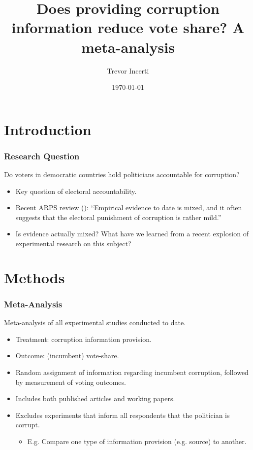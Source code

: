 \documentclass[usenames,dvipsnames]{beamer}
\title{Does providing corruption information reduce vote share? A meta-analysis}
\date{\today}
\author{Trevor Incerti}
\institute{Yale University}
\begin{document}
\maketitle


\section{Introduction}

\begin{frame}
\frametitle{Research Question}
Do voters in democratic countries hold politicians accountable for corruption?
\pause
\begin{itemize}
\item Key question of electoral accountability. 
\pause
\item Recent ARPS review (\citet{de2017electoral}): ``Empirical evidence to date is \textcolor{Cerulean}{mixed}, and it often suggests that the electoral punishment of corruption is rather mild.'' 
\pause
\item Is evidence actually mixed? What have we learned from a recent explosion of experimental research on this subject?
\end{itemize}
\end{frame}


\section{Methods}

\begin{frame}
\frametitle{Meta-Analysis}
Meta-analysis of all \textcolor{Cerulean}{experimental} studies conducted to date. 
\pause
\begin{itemize}
\item \textcolor{Cerulean}{Treatment}: corruption information provision. 
\pause
\item \textcolor{Cerulean}{Outcome}: (incumbent) vote-share.
\pause
\item Random assignment of information regarding
incumbent corruption, followed by measurement of voting outcomes.
\pause
\item Includes both \textcolor{Cerulean}{published articles and working papers}.
\pause
\item Excludes experiments that inform all respondents that the politician is corrupt.
\begin{itemize}
\item E.g. Compare one type of information provision (e.g. source) to another.
\end{itemize}
\end{itemize}
\end{frame}
\end{document}
